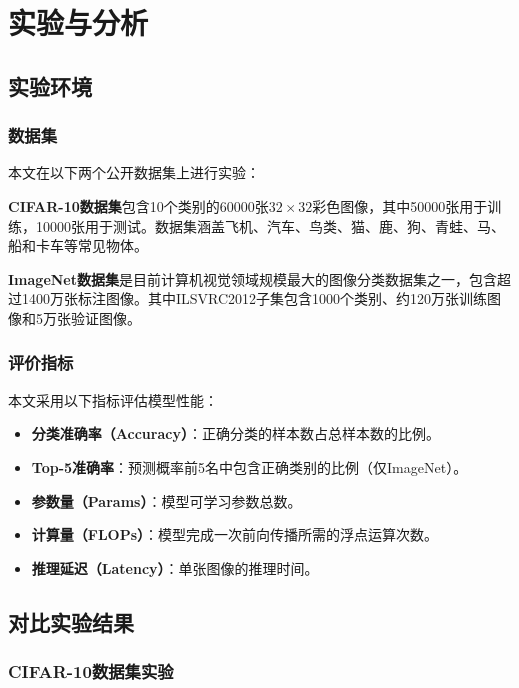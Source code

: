 \chapter{实验与分析}

\section{实验环境}

\subsection{数据集}

本文在以下两个公开数据集上进行实验：

\textbf{CIFAR-10数据集}包含10个类别的60000张$32 \times 32$彩色图像，其中50000张用于训练，10000张用于测试。数据集涵盖飞机、汽车、鸟类、猫、鹿、狗、青蛙、马、船和卡车等常见物体。

\textbf{ImageNet数据集}是目前计算机视觉领域规模最大的图像分类数据集之一，包含超过1400万张标注图像。其中ILSVRC2012子集包含1000个类别、约120万张训练图像和5万张验证图像。

\subsection{评价指标}

本文采用以下指标评估模型性能：

\begin{itemize}
    \item \textbf{分类准确率（Accuracy）}：正确分类的样本数占总样本数的比例。
    \item \textbf{Top-5准确率}：预测概率前5名中包含正确类别的比例（仅ImageNet）。
    \item \textbf{参数量（Params）}：模型可学习参数总数。
    \item \textbf{计算量（FLOPs）}：模型完成一次前向传播所需的浮点运算次数。
    \item \textbf{推理延迟（Latency）}：单张图像的推理时间。
\end{itemize}

\section{对比实验结果}

\subsection{CIFAR-10数据集实验}


